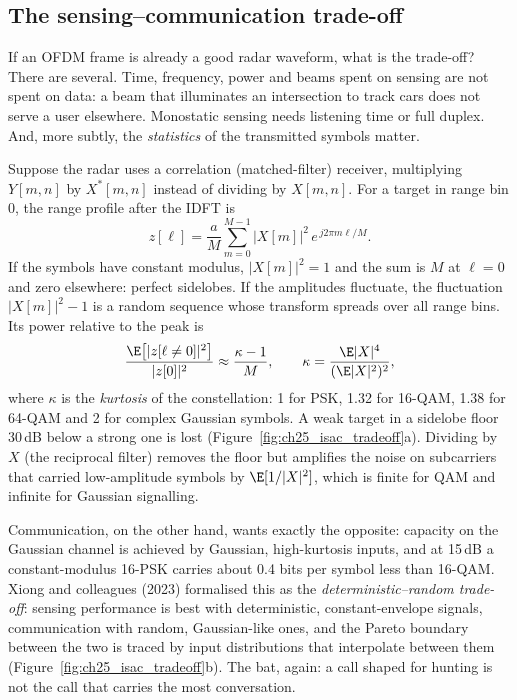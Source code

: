 \subsection{The sensing--communication trade-off}

If an OFDM frame is already a good radar waveform, what is the trade-off? There are several. Time,
frequency, power and beams spent on sensing are not spent on data: a beam that illuminates an
intersection to track cars does not serve a user elsewhere. Monostatic sensing needs listening
time or full duplex. And, more subtly, the \emph{statistics} of the transmitted symbols matter.

Suppose the radar uses a correlation (matched-filter) receiver, multiplying $Y[m,n]$ by $X^*[m,n]$
instead of dividing by $X[m,n]$. For a target in range bin 0, the range profile after the IDFT is
\begin{equation}
z[\ell]=\frac{a}{M}\sum_{m=0}^{M-1}|X[m]|^2\,e^{\,j2\pi m\ell/M}.
\end{equation}
If the symbols have constant modulus, $|X[m]|^2=1$ and the sum is $M$ at $\ell=0$ and zero elsewhere:
perfect sidelobes. If the amplitudes fluctuate, the fluctuation $|X[m]|^2-1$ is a random sequence whose
transform spreads over all range bins. Its power relative to the peak is
\begin{equation}
\frac{\E\big[|z[\ell\ne0]|^2\big]}{|z[0]|^2}\approx\frac{\kappa-1}{M},\qquad\kappa=\frac{\E|X|^4}{(\E|X|^2)^2},
\label{eq:ch25:floor}
\end{equation}
where $\kappa$ is the \emph{kurtosis} of the constellation: 1 for PSK, 1.32 for 16-QAM, 1.38 for 64-QAM
and 2 for complex Gaussian symbols. A weak target in a sidelobe floor 30\,dB below a strong one is
lost (Figure~\ref{fig:ch25_isac_tradeoff}a). Dividing by $X$ (the reciprocal filter) removes the floor
but amplifies the noise on subcarriers that carried low-amplitude symbols by $\E[1/|X|^2]$, which is
finite for QAM and infinite for Gaussian signalling.

Communication, on the other hand, wants exactly the opposite: capacity on the Gaussian channel is
achieved by Gaussian, high-kurtosis inputs, and at 15\,dB a constant-modulus 16-PSK carries about
0.4 bits per symbol less than 16-QAM. Xiong and colleagues (2023) formalised this as the
\emph{deterministic--random trade-off}: sensing performance is best with deterministic,
constant-envelope signals, communication with random, Gaussian-like ones, and the Pareto boundary
between the two is traced by input distributions that interpolate between them
(Figure~\ref{fig:ch25_isac_tradeoff}b). The bat, again: a call shaped for hunting is not the call
that carries the most conversation.

